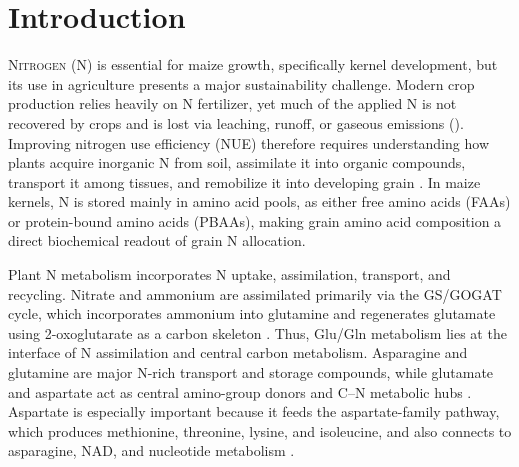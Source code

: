 
\section{Introduction}

\lettrine[lines=2]{\color{color2}N}{itrogen} (N) is essential for maize growth, specifically kernel development, but its use in agriculture presents a major sustainability challenge. Modern crop production relies heavily on N fertilizer, yet much of the applied N is not recovered by crops and is lost via leaching, runoff, or gaseous emissions (\cite{OjedaRivera2025NitrogenEfficientMaize}). Improving nitrogen use efficiency (NUE) therefore requires understanding how plants acquire inorganic N from soil, assimilate it into organic compounds, transport it among tissues, and remobilize it into developing grain \citep{MasclauxDaubresse2010NUE,Have2017NRemobilization}. In maize kernels, N is stored mainly in amino acid pools, as either free amino acids (FAAs) or protein-bound amino acids (PBAAs), making grain amino acid composition a direct biochemical readout of grain N allocation.

Plant N metabolism incorporates N uptake, assimilation, transport, and recycling. Nitrate and ammonium are assimilated primarily via the GS/GOGAT cycle, which incorporates ammonium into glutamine and regenerates glutamate using 2-oxoglutarate as a carbon skeleton \citep{MasclauxDaubresse2010NUE,Hodges2002TwoOxoglutarate}. Thus, Glu/Gln metabolism lies at the interface of N assimilation and central carbon metabolism. Asparagine and glutamine are major N-rich transport and storage compounds, while glutamate and aspartate act as central amino-group donors and C–N metabolic hubs \citep{Bernard2009CytosolicGS,MasclauxDaubresse2010NUE}. Aspartate is especially important because it feeds the aspartate-family pathway, which produces methionine, threonine, lysine, and isoleucine, and also connects to asparagine, NAD, and nucleotide metabolism \citep{Viola2001AspartatePathway,Wang2018AspSeeds,Han2021Aspartate}.

